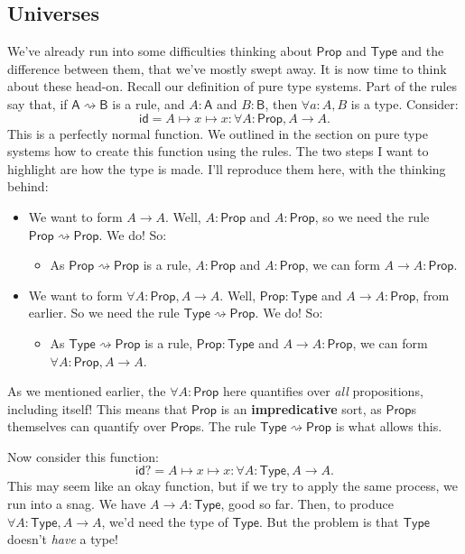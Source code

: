 \documentclass[11pt,paper=letter]{scrartcl}
\newcommand{\sf}{\mathsf}
\newcommand{\prop}{\mathsf{Prop}}
\newcommand{\type}{\mathsf{Type}}
\newcommand{\toto}{\rightsquigarrow}
\begin{document}
\subsection{Universes}

We've already run into some difficulties thinking about $\prop$ and $\type$ and the difference between them, that we've mostly swept away. It is now time to think about these head-on. Recall our definition of pure type systems. Part of the rules say that, if $\sf{A} \toto \sf{B}$ is a rule, and $A : \sf{A}$ and $B: \sf{B}$, then $\forall a: A, B$ is a type. Consider:
\[
\sf{id} = A \mapsto x \mapsto x : \forall A: \prop, A \to A.
\]
This is a perfectly normal function. We outlined in the section on pure type systems how to create this function using the rules. The two steps I want to highlight are how the type is made. I'll reproduce them here, with the thinking behind:
\begin{itemize}
\item We want to form $A \to A$. Well, $A: \prop$ and $A: \prop$, so we need the rule $\prop \toto \prop$. We do! So:
\begin{itemize}
  \item As $\prop \toto \prop$ is a rule, $A: \prop$ and $A: \prop$, we can form $A \to A: \prop$.
\end{itemize}
\item We want to form $\forall A: \prop, A \to A$. Well, $\prop: \type$ and $A \to A: \prop$, from earlier. So we need the rule $\type \toto \prop$. We do! So:
\begin{itemize}
  \item As $\type \toto \prop$ is a rule, $\prop: \type$ and $A \to A: \prop$, we can form $\forall A: \prop, A \to A$.
\end{itemize}
\end{itemize}

As we mentioned earlier, the $\forall A: \prop$ here quantifies over \emph{all} propositions, including itself! This means that $\prop$ is an \textbf{impredicative} sort, as $\prop$s themselves can quantify over $\prop$s. The rule $\type \toto \prop$ is what allows this.

Now consider this function: \[
\sf{id?} = A \mapsto x \mapsto x : \forall A: \type, A \to A.
\]
This may seem like an okay function, but if we try to apply the same process, we run into a snag. We have $A \to A: \type$, good so far. Then, to produce $\forall A: \type, A \to A$, we'd need the type of $\type$. But the problem is that $\type$ doesn't \emph{have} a type!
\end{document}
